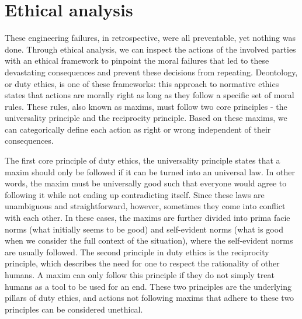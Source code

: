 \documentclass[12pt]{article}
\begin{document}
	\section*{Ethical analysis}
	These engineering failures, in retrospective, were all preventable, yet nothing was done. Through ethical analysis, we can inspect the actions of the involved parties with an ethical framework to  pinpoint the moral failures that led to these devastating consequences and prevent these decisions from repeating. Deontology, or duty ethics, is one of these frameworks: this approach to normative ethics states that actions are morally right as long as they follow a specific set of moral rules. These rules, also known as maxims, must follow two core principles - the universality principle and the reciprocity principle. Based on these maxims, we can categorically define each action as right or wrong independent of their consequences.
	
	The first core principle of duty ethics, the universality principle states that a maxim should only be followed if it can be turned into an universal law. In other words, the maxim must be universally good such that everyone would agree to following it while not ending up contradicting itself. Since these laws are unambiguous and straightforward, however, sometimes they come into conflict with each other. In these cases, the maxims are further divided into prima facie norms (what initially seems to be good) and self-evident norms (what is good when we consider the full context of the situation), where the self-evident norms are usually followed. The second principle in duty ethics is the reciprocity principle, which describes the need for one to respect the rationality of other humans. A maxim can only follow this principle if they do not simply treat humans as a tool to be used for an end. These two principles are the underlying pillars of duty ethics, and actions not following maxims that adhere to these two principles can be considered unethical.
	
\end{document}
